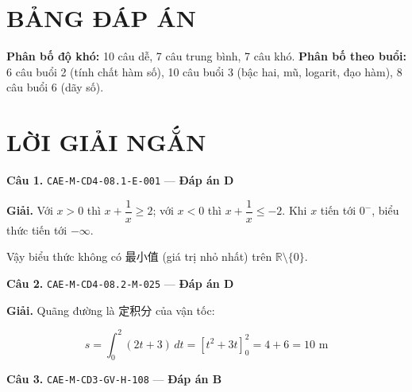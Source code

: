 \documentclass[11pt, a4paper]{article}
\begin{document}

\section{BẢNG ĐÁP ÁN}



\textbf{Phân bố độ khó:} 10 câu dễ, 7 câu trung bình, 7 câu khó.
\textbf{Phân bố theo buổi:} 6 câu buổi 2 (tính chất hàm số), 10 câu buổi 3 (bậc hai, mũ, logarit, đạo hàm), 8 câu buổi 6 (dãy số).

\section{LỜI GIẢI NGẮN}

\textbf{Câu 1.} \texttt{CAE-M-CD4-08.1-E-001} — \textbf{Đáp án D}

\textbf{Giải.} Với $x > 0$ thì $x + \dfrac{1}{x} \ge 2$; với $x < 0$ thì $x + \dfrac{1}{x} \le -2$. Khi $x$ tiến tới $0^-$, biểu thức tiến tới $-\infty$.

Vậy biểu thức không có 最小值 (giá trị nhỏ nhất) trên $\mathbb{R} \setminus \{0\}$.

\textbf{Câu 2.} \texttt{CAE-M-CD4-08.2-M-025} — \textbf{Đáp án D}

\textbf{Giải.} Quãng đường là 定积分 của vận tốc:

$$s = \int_0^2 (2t + 3)\,dt = \left[t^2 + 3t\right]_0^2 = 4 + 6 = 10 \text{ m}$$

\textbf{Câu 3.} \texttt{CAE-M-CD3-GV-H-108} — \textbf{Đáp án B}
\end{document}
